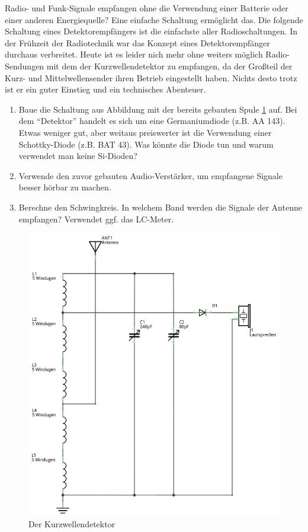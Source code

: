 Radio- und Funk-Signale empfangen ohne die Verwendung einer Batterie oder einer
anderen Energiequelle? Eine einfache Schaltung ermöglicht das. Die folgende
Schaltung eines Detektorempfängers ist die einfachste aller Radioschaltungen. In
der Frühzeit der Radiotechnik war das Konzept eines Detektorempfänger durchaus
verbreitet. Heute ist es leider nich mehr ohne weiters möglich Radio-Sendungen
mit dem der Kurzwellendetektor zu empfangen, da der Großteil der Kurz- und
Mittelwellensender ihren Betrieb eingestellt haben. Nichts desto trotz ist er
ein guter Einstieg und ein technisches Abenteuer.

\begin{enumerate}
    \item Baue die Schaltung aus Abbildung mit der bereits gebauten Spule
      \ref{kd} auf. Bei dem "`Detektor"' handelt es sich um eine Germaniumdiode
      (z.B. AA 143). Etwas weniger gut, aber weitaus preiswerter ist die
      Verwendung einer Schottky-Diode (z.B. BAT 43).  Was könnte die Diode tun
      und warum verwendet man keine Si-Dioden?
   \item Verwende den zuvor gebauten Audio-Verstärker, um empfangene Signale
     besser hörbar zu machen.
   \item Berechne den Schwingkreis. In welchem Band werden die Signale der
     Antenne empfangen? Verwendet ggf. das LC-Meter.  
\end{enumerate}

\begin{figure}[H]
    \centering
    \includegraphics[scale=1]{Kurzwellendetektor/Schaltungen/Kurzwellendetektor_Schaltplan.pdf}
    \caption{Der Kurzwellendetektor}
    \label{kd}
\end{figure}
